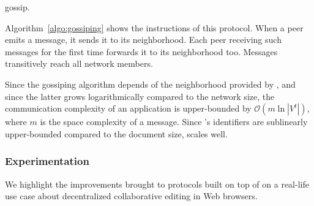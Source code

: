 


\begin{algorithm}[h]
  
  \caption{\label{algo:gossiping}gossip.}
\end{algorithm}

Algorithm~\ref{algo:gossiping} shows the instructions of this protocol. When a
peer emits a message, it sends it to its neighborhood. Each peer receiving such
messages for the first time forwards it to its neighborhood too. Messages
transitively reach all network members.

Since the gossiping algorithm depends of the neighborhood provided by \SPRAY,
and since the latter grows logarithmically compared to the network size, the
communication complexity of an application is upper-bounded by
$\mathcal{O}(m \ln |V^t|)$, where $m$ is the space complexity of a
message. Since \CRATE's identifiers are sublinearly upper-bounded compared to
the document size, \CRATE scales well.


\subsubsection{Experimentation}
\label{subsec:experiments2}

We highlight the improvements brought to protocols built on top of \SPRAY on a
real-life use case about decentralized collaborative editing in Web browsers.



